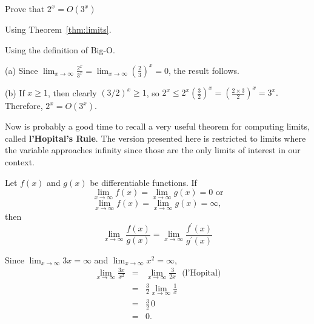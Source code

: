 \begin{exer}
Prove that $2^x=O(3^x)$
\begin{lenum}
\item Using Theorem~\ref{thm:limits}.

\vspace*{1.5in}
\item Using the definition of Big-O.

\vspace*{1.5in}
\end{lenum}
\begin{answer}
(a)
Since 
${\displaystyle \lim_{x\rightarrow\infty} \frac{2^x}{ 3^x}
= \lim_{x\rightarrow\infty} \left(\frac{2}{ 3}\right)^x
= 0}$, the result follows.

(b)
If $x\geq 1$, then clearly $(3/2)^x\geq 1$, so 
$2^x\leq 
2^x\left(\frac{3}{ 2}\right)^x=
\left(\frac{2\times 3}{ 2}\right)^x=3^x.$
Therefore, $2^x=O(3^x)$.
\end{answer}
\end{exer}



Now is probably a good time to recall a very useful theorem for computing
limits, called {\bf l'Hopital's Rule}.  The version presented here is
restricted to limits where the variable
approaches infinity since those are the only limits of interest in our context.

\begin{thm}\label{thm:lhop}
Let $f(x)$ and $g(x)$ be differentiable functions.
If 
$$\lim_{x\rightarrow\infty}f(x)=\lim_{x\rightarrow\infty}g(x)=0 \mbox{ or}$$ 
$$\lim_{x\rightarrow\infty}f(x)=\lim_{x\rightarrow\infty}g(x)=\infty,$$ 
then
$$
\lim_{x\rightarrow\infty} \frac{f(x)}{ g(x)}=
\lim_{x\rightarrow\infty} \frac{f^{\prime}(x)}{ g^{\prime}(x)}$$
\end{thm}


\begin{exa}
Since $\displaystyle \lim_{x\rightarrow\infty} 3x=\infty$ and
$\displaystyle \lim_{x\rightarrow\infty} x^2=\infty$, 
\begin{eqnarray*}
\lim_{x\rightarrow\infty} \frac{3x}{x^2}
&=&\lim_{x\rightarrow\infty} \frac{3}{2x} \, \, \, \,   \mbox{(l'Hopital)}\\
&=&\frac{3}{2}\lim_{x\rightarrow\infty} \frac{1}{x}\\
&=&\frac{3}{2}\,0\\
&=&0.
\end{eqnarray*}
\end{exa}

